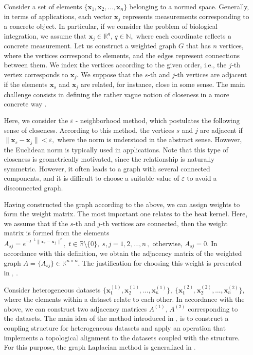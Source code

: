 \documentclass[a4paper,twoside,12pt]{article}
\begin{document}
  Consider a set of   elements
 $
 \{\mathbf{x}_{1},\mathbf{x}_{2},\dots,\mathbf{x}_{n} \}
 $
 belonging to  a normed space. Generally, in terms of applications, each vector $\mathbf{x}_{j}$ represents  measurements  corresponding to a concrete object. In particular, if we consider the  problem of biological integration, we assume that $\mathbf{x}_{j}\in \mathbb{R}^{q},\,q\in \mathbb{N},$ where each coordinate reflects a concrete measurement.
Let us construct a weighted graph $G$ that has   $n$ vertices, where the vertices correspond to elements, and the  edges represent connections between them.
We index the vertices according to the given order, i.e., the $j$-th vertex corresponds to $\mathbf{x}_{j}.$  We suppose that   the  $s$-th  and $j$-th  vertices   are adjacent  if the elements   $\mathbf{x}_{s}$ and  $\mathbf{x}_{j}$ are related,  for instance, close in some sense. The main challenge   consists in defining  the rather vague notion of  closeness in a more concrete way \cite{Belkin2003}.

Here, we consider   the  $\varepsilon$ - neighborhood method, which postulates the following sense of closeness.  According to this method, the vertices    $s$ and $j$ are adjacent if
 $
 \|\mathbf{x}_{s}-\mathbf{x}_{j} \|   <\varepsilon,
 $
where the norm is understood in the abstract sense. However, the Euclidean norm is typically    used  in applications.
Note that this type of closeness is geometrically motivated, since
the relationship is naturally symmetric. However, it often
leads to a graph  with several connected components, and it is  difficult
to choose a suitable value of $\varepsilon$ to avoid a disconnected graph.






  Having constructed the graph according to the above,  we can assign weights to form the weight matrix. The most important one  relates to the heat kernel. Here, we assume that if   the  $s$-th and $j$-th vertices are connected, then the weight matrix is formed from the elements
$
A_{sj}=e^{- t^{-1}\|\mathbf{x}_{s}-\mathbf{x}_{j}\|^{2} },\;t\in \mathbb{R} \setminus \{0\},\;s,j=1,2,\dots,n\,,
$
otherwise,  $A_{sj}  = 0.$
In accordance with this definition, we obtain the adjacency matrix of the weighted graph
$
A= \{A_{sj}\}\in \mathbb{R}^{n\times n}.
$
 The justification for  choosing this weight is presented in  \cite{Ham2005}, \cite{Ek2009}.

  Consider  heterogeneous datasets
$
 \{\mathbf{x}^{(1)}_{1},\mathbf{x}^{(1)}_{2},\dots,\mathbf{x}^{(1)}_{n} \},\;\{\mathbf{x}^{(2)}_{1},\mathbf{x}^{(2)}_{2},\dots,\mathbf{x}^{(2)}_{n} \},
$
where the elements within a dataset relate to each other.
 In accordance with the above, we can construct two adjacency matrices $A^{(1)},\,A^{(2)}$ corresponding to the datasets.
The main idea of the method introduced in \cite{KABaChu25}, \cite{KABaChu26}  is to  construct a coupling structure for  heterogeneous datasets and apply an  operation that implements a topological alignment  to the datasets coupled with the structure. For this purpose, the graph Laplacian method is generalized in \cite{KABaChu26}.
\end{document}
